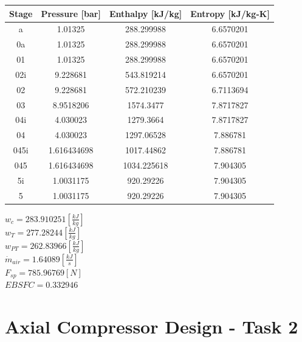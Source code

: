 \documentclass[titlepage]{article}
\begin{document}
    \begin{center}
        \begin{tabular}{|c|c|c|c|}
            \hline
            Stage & Pressure [bar] & Enthalpy [kJ/kg] & Entropy [kJ/kg-K]\\
            \hline
             a & 1.01325 & 288.299988 & 6.6570201 \\
            \hline
            0a & 1.01325 & 288.299988 & 6.6570201 \\
            \hline
            01 & 1.01325 & 288.299988 & 6.6570201 \\
            \hline
            02i & 9.228681 & 543.819214 & 6.6570201 \\
            \hline
            02 & 9.228681 & 572.210239 & 6.7113694 \\
            \hline
            03 & 8.9518206 & 1574.3477 & 7.8717827 \\
            \hline
            04i & 4.030023 & 1279.3664 & 7.8717827 \\
            \hline
            04 & 4.030023 & 1297.06528 & 7.886781 \\
            \hline
            045i & 1.616434698 & 1017.44862 & 7.886781 \\
            \hline
            045 & 1.616434698 & 1034.225618 & 7.904305 \\
            \hline
            5i & 1.0031175 & 920.29226 & 7.904305 \\
            \hline
            5 & 1.0031175 & 920.29226 & 7.904305 \\
            \hline
        \end{tabular}
    \end{center}

    \begin{center}
        $w_{c} = 283.910251 [\frac{kJ}{kg}]$ \\
        $w_{T} = 277.28244 [\frac{kJ}{kg}]$ \\
        $w_{PT} = 262.83966 [\frac{kJ}{kg}]$ \\
        $\dot{m}_{air} = 1.64089 [\frac{kJ}{s}]$ \\
        $F_{sp} = 785.96769 [N]$ \\
        $EBSFC = 0.332946$ \\
    \end{center}

    \section{Axial Compressor Design - Task 2}
\end{document}
